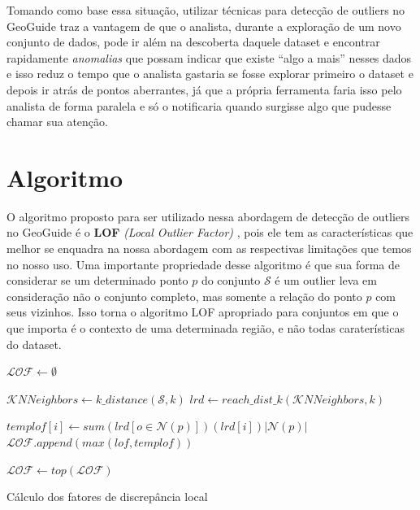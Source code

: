 Tomando como base essa situação, utilizar técnicas para detecção de outliers no GeoGuide traz a vantagem de que o analista, durante a exploração de um novo conjunto de dados, pode ir além na descoberta daquele dataset e encontrar rapidamente \textit{anomalias} que possam indicar que existe ``algo a mais'' nesses dados e isso reduz o tempo que o analista gastaria se fosse explorar primeiro o dataset e depois ir atrás de pontos aberrantes, já que a própria ferramenta faria isso pelo analista de forma paralela e só o notificaria quando surgisse algo que pudesse chamar sua atenção.

\section{Algoritmo}

O algoritmo proposto para ser utilizado nessa abordagem de detecção de outliers no GeoGuide \cite{omidvarTehrani2017} é o \textbf{LOF} \textit{(Local Outlier Factor)} \cite{Breunig:2000:LID:335191.335388}, pois ele tem as características que melhor se enquadra na nossa abordagem com as respectivas limitações que temos no nosso uso. Uma importante propriedade desse algoritmo é que sua forma de considerar se um determinado ponto $p$ do conjunto $\mathcal{S}$ é um outlier leva em consideração não o conjunto completo, mas somente a relação do ponto $p$ com seus vizinhos. Isso torna o algoritmo LOF apropriado para conjuntos em que o que importa é o contexto de uma determinada região, e não todas caraterísticas do dataset.

\begin{algorithm}[!h]
	\DontPrintSemicolon
	$\mathcal{LOF} \gets \emptyset$\;
	{
		$\mathcal{K}NNeighbors \gets \mathit{k\_distance}(\mathcal{S}, k)$\label{ln:k_distance}\;
		$lrd \gets \mathit{reach\_dist\_k}(\mathcal{K}NNeighbors, k)$\label{ln:reach_dist_k}\;

		{
			$templof[i] \gets sum(lrd[o \in \mathcal{N} (p)])(lrd[i])|\mathcal{N}(p)|$\;
			$\mathcal{LOF}.append(max(lof, templof))$\;
		}
	}
	$\mathcal{LOF} \gets top(\mathcal{LOF})$\;
	\;  
	\caption{Cálculo dos fatores de discrepância local}
	\label{algo:lof}
\end{algorithm}


